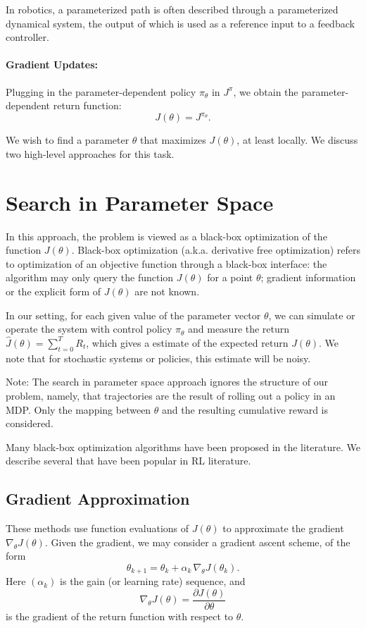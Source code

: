 In robotics, a parameterized path is often described through a parameterized dynamical system, the output of which is used as a reference input to a feedback controller.

\paragraph{Gradient Updates:}  Plugging in the parameter-dependent policy ${\pi _\theta }$ in ${J^\pi }$,  we obtain the parameter-dependent return function:
\[J(\theta ) = {J^{{\pi _\theta }}}.\]

We wish to find a parameter $\theta $ that maximizes $J(\theta )$, at least locally. We discuss two high-level approaches for this task.

\section{Search in Parameter Space}
In this approach, the problem is viewed as a black-box optimization of the function $J(\theta )$.
Black-box optimization (a.k.a. derivative free optimization) refers to optimization of an objective function through a black-box interface: the algorithm may only query the function $J(\theta )$ for a point $\theta$; gradient information or the explicit form of $J(\theta)$ are not known. 

In our setting, for each given value of the parameter vector $\theta $, we can simulate or operate the system with control policy ${\pi _\theta }$ and measure the return  $\hat J(\theta ) = \sum\nolimits_{t = 0}^T {{R_t}} $, which gives a estimate of the expected return $J(\theta )$. We note that for stochastic systems or policies, this estimate will be noisy.

Note: The search in parameter space approach ignores the structure of our problem, namely, that trajectories are the result of rolling out a policy in an MDP. Only the mapping between $\theta$ and the resulting cumulative reward is considered.

Many black-box optimization algorithms have been proposed in the literature. We describe several that have been popular in RL literature.

\subsection{Gradient Approximation}

These methods use function evaluations of $J(\theta )$ to approximate the gradient ${\nabla _\theta }J(\theta )$.
Given the gradient, we may consider a gradient ascent scheme, of the form
\begin{equation}\label{eq:grad_ascent_scheme}
{\theta _{k + 1}} = {\theta _k} + {\alpha _k}\,{\nabla _\theta }J({\theta _k}).
\end{equation}
Here  $({\alpha _k})$ is the gain (or learning rate) sequence, and
\[{\nabla _\theta }J(\theta ) = \frac{{\partial J(\theta )}}{{\partial \theta }}\]
is the gradient of the return function with respect to $\theta $.

